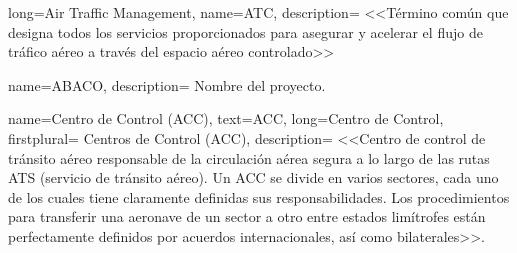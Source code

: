 \makeglossaries

%
%
%        
%

%
%
%        
%



{
    long={Air Traffic Management}, %
    name={ATC}, 
    description=
    {
       <<Término común que designa todos los servicios proporcionados para asegurar y acelerar el flujo de tráfico 
       aéreo a través del espacio aéreo controlado>>~\cite{ENAIRE-web}
    }
}

{
    name={ABACO},
    description=
    {   
        Nombre del proyecto. %
    }
}

{
    name={Centro de Control (ACC)},
    text={ACC},
	long={Centro de Control}, %
	firstplural= {Centros de Control (ACC)},
    description=
    {
        <<Centro de control de tránsito aéreo responsable de la circulación aérea segura a lo largo de las rutas ATS 
        (servicio de tránsito aéreo). Un ACC se divide en varios sectores, cada uno de los cuales tiene claramente 
        definidas sus responsabilidades. Los procedimientos para transferir una aeronave de un sector a otro entre 
        estados limítrofes están perfectamente definidos por acuerdos internacionales, así como 
        bilaterales>>. \cite{ENAIRE-web}
    }
}

